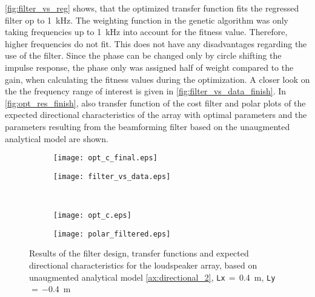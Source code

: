 \autoref{fig:filter_vs_reg} shows, that the optimized transfer function fits the regressed filter op to \SI{1}{\kilo\hertz}. The weighting function in the genetic algorithm was only taking frequencies up to \SI{1}{\kilo\hertz} into account for the fitness value. Therefore, higher frequencies do not fit. This does not have any disadvantages regarding the use of the filter. Since the phase can be changed only by circle shifting the impulse response, the phase only was assigned half of weight compared to the gain, when calculating the fitness values during the optimization. A closer look on the the frequency range of interest is given in \autoref{fig:filter_vs_data_finish}. In \autoref{fig:opt_res_finish}, also transfer function of the cost filter and polar plots of the expected directional characteristics of the array with optimal parameters and the parameters resulting from the beamforming filter based on the unaugmented analytical model are shown.


\begin{figure}[H]
\begin{subfigure}[c]{0.5\textwidth}
\texttt{[image: opt\_c\_final.eps]}
\label{fig:opt_res_a_finish}
\end{subfigure}
\begin{subfigure}[c]{0.5\textwidth}
\texttt{[image: filter\_vs\_data.eps]}
\label{fig:filter_vs_data_finish}
\end{subfigure}\\
\hspace{0.1\textheight}
\begin{subfigure}[c]{0.5\textwidth}
\texttt{[image: opt\_c.eps]}
\label{fig:opt_res_c_finish}
\end{subfigure}
\begin{subfigure}[c]{0.5\textwidth}
\texttt{[image: polar\_filtered.eps]}
\label{fig:polar_filtered_finish}
\end{subfigure}
\caption{Results of the filter design, transfer functions and expected directional characteristics for the loudspeaker array, based on unaugmented analytical model \ref{ax:directional_2}, \textcolor{green3}{\texttt{Lx}}\,$=$\,\SI{0.4}{\meter}, \textcolor{green3}{\texttt{Ly}}\,$=\,$\SI{-0.4}{\meter}}
		\label{fig:opt_res_finish}
\end{figure}


